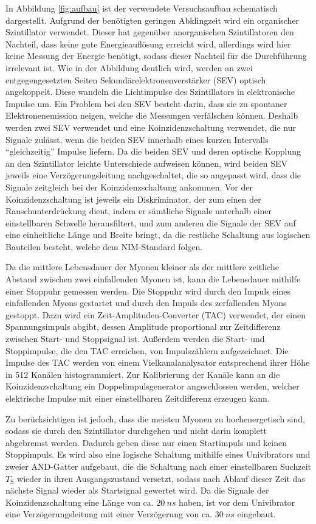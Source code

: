 In Abbildung \ref{fig:aufbau} ist der verwendete Versuchsaufbau schematisch dargestellt. Aufgrund der benötigten geringen Abklingzeit wird ein organischer Szintillator
verwendet. Dieser hat gegenüber anorganischen Szintillatoren den Nachteil, dass keine gute Energieauflösung erreicht wird, allerdings wird hier keine Messung der
Energie benötigt, sodass dieser Nachteil für die Durchführung irrelevant ist.
Wie in der Abbildung deutlich wird, werden an zwei entgegengesetzten Seiten Sekundärelektronenverstärker (SEV) optisch angekoppelt. Diese wandeln die Lichtimpulse
des Szintillators in elektronische Impulse um. Ein Problem bei den SEV besteht darin, dass sie zu spontaner Elektronenemission neigen, welche die Messungen
verfälschen können. Deshalb werden zwei SEV verwendet und eine Koinzidenzschaltung verwendet, die nur Signale zulässt, wenn die beiden SEV innerhalb eines kurzen Intervalls \enquote{gleichzeitig}
Impulse liefern. Da die beiden SEV und deren optische Kopplung an den Szintillator leichte Unterschiede aufweisen können, wird beiden SEV jeweils eine Verzögerungsleitung nachgeschaltet, die
so angepasst wird, dass die Signale zeitgleich bei der Koinzidenzschaltung ankommen. Vor der Koinzidenzschaltung ist jeweils ein Diskriminator, der zum einen der Rauschunterdrückung dient,
indem er sämtliche Signale unterhalb einer einstellbaren Schwelle herausfiltert,
und zum anderen die Signale der SEV auf eine einheitliche Länge und Breite bringt, da die restliche Schaltung aus logischen Bauteilen besteht, welche dem NIM-Standard folgen.

Da die mittlere Lebensdauer der Myonen kleiner als der mittlere zeitliche Abstand zwischen zwei einfallenden Myonen ist, kann die Lebensdauer mithilfe einer Stoppuhr gemessen werden.
Die Stoppuhr wird durch den Impuls eines einfallenden Myons gestartet und durch den Impuls des zerfallenden Myons gestoppt. Dazu wird ein Zeit-Amplituden-Converter (TAC) verwendet,
der einen Spannungsimpuls abgibt, dessen Amplitude proportional
zur Zeitdifferenz zwischen Start- und Stoppsignal ist. Außerdem werden die Start- und Stoppimpulse, die den TAC erreichen, von Impulszählern aufgezeichnet. Die Impulse des TAC werden von einem
Vielkanalanalysator entsprechend ihrer Höhe in 512 Kanälen histogrammiert. Zur Kalibrierung der Kanäle kann an die Koinzidenzschaltung ein Doppelimpulsgenerator angeschlossen werden, welcher
elektrische Impulse mit einer einstellbaren Zeitdifferenz erzeugen kann.

Zu berücksichtigen ist jedoch, dass die meisten Myonen zu hochenergetisch sind, sodass sie durch den Szintillator durchgehen und nicht darin komplett abgebremst werden. Dadurch geben diese
nur einen Startimpuls und keinen Stoppimpuls. Es wird also eine logische Schaltung mithilfe eines Univibrators und zweier AND-Gatter aufgebaut, die die Schaltung nach einer einstellbaren
Suchzeit $T_\text{S}$ wieder in ihren Ausgangszustand versetzt, sodass nach Ablauf dieser Zeit das nächste Signal wieder als Startsignal gewertet wird. Da die Signale der Koinzidenzschaltung
eine Länge von ca. $\SI{20}{ns}$ haben, ist vor dem Univibrator eine Verzögerungsleitung mit einer Verzögerung von ca. $\SI{30}{ns}$ eingebaut.

